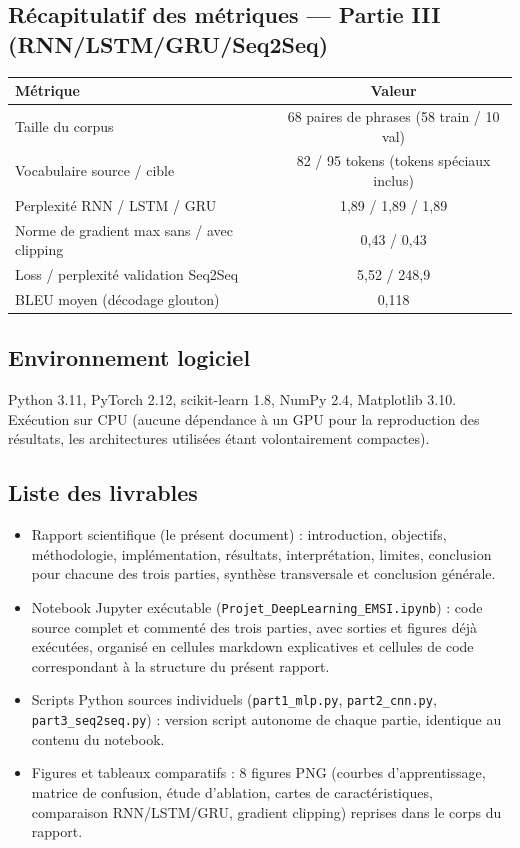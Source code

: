 \documentclass[11pt,a4paper]{article}
\begin{document}
\subsection{Récapitulatif des métriques --- Partie III (RNN/LSTM/GRU/Seq2Seq)}

\begin{table}[h]
\centering
\begin{tabular}{lc}
\toprule
\textbf{Métrique} & \textbf{Valeur} \\
\midrule
Taille du corpus                                  & 68 paires de phrases (58 train / 10 val) \\
Vocabulaire source / cible                        & 82 / 95 tokens (tokens spéciaux inclus) \\
Perplexité RNN / LSTM / GRU                       & 1,89 / 1,89 / 1,89 \\
Norme de gradient max sans / avec clipping        & 0,43 / 0,43 \\
Loss / perplexité validation Seq2Seq              & 5,52 / 248,9 \\
BLEU moyen (décodage glouton)                      & 0,118 \\
\bottomrule
\end{tabular}
\end{table}

\subsection{Environnement logiciel}

Python 3.11, PyTorch 2.12, scikit-learn 1.8, NumPy 2.4, Matplotlib 3.10. Exécution sur CPU (aucune dépendance à un GPU pour la reproduction des résultats, les architectures utilisées étant volontairement compactes).

\subsection{Liste des livrables}

\begin{itemize}[leftmargin=1.2cm]
\item Rapport scientifique (le présent document) : introduction, objectifs, méthodologie, implémentation, résultats, interprétation, limites, conclusion pour chacune des trois parties, synthèse transversale et conclusion générale.
\item Notebook Jupyter exécutable (\texttt{Projet\_DeepLearning\_EMSI.ipynb}) : code source complet et commenté des trois parties, avec sorties et figures déjà exécutées, organisé en cellules markdown explicatives et cellules de code correspondant à la structure du présent rapport.
\item Scripts Python sources individuels (\texttt{part1\_mlp.py}, \texttt{part2\_cnn.py}, \texttt{part3\_seq2seq.py}) : version script autonome de chaque partie, identique au contenu du notebook.
\item Figures et tableaux comparatifs : 8 figures PNG (courbes d'apprentissage, matrice de confusion, étude d'ablation, cartes de caractéristiques, comparaison RNN/LSTM/GRU, gradient clipping) reprises dans le corps du rapport.
\end{itemize}
\end{document}

